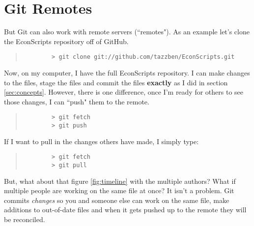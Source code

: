 \section{Git Remotes}

But Git can also work with remote servers (``remotes").  As an example let's clone the EconScripts repository off of GitHub.

\begin{quote}
	\begin{verbatim}
		> git clone git://github.com/tazzben/EconScripts.git
	\end{verbatim}
\end{quote}

Now, on my computer, I have the full EconScripts repository.  I can make changes to the files, stage the files and commit the files \textbf{exactly} as I did in section \ref{sec:concepts}.  However, there is one difference, once I'm ready for others to see those changes, I can ``push" them to the remote.

\begin{quote}
	\begin{verbatim}
		> git fetch
		> git push
	\end{verbatim}
\end{quote}

If I want to pull in the changes others have made, I simply type:

\begin{quote}
	\begin{verbatim}
		> git fetch
		> git pull
	\end{verbatim}
\end{quote}

But, what about that figure \ref{fig:timeline} with the multiple authors?  What if multiple people are working on the same file at once?  It isn't a problem.  Git commits \emph{changes} so you and someone else can work on the same file, make additions to out-of-date files and when it gets pushed up to the remote they will be reconciled.   